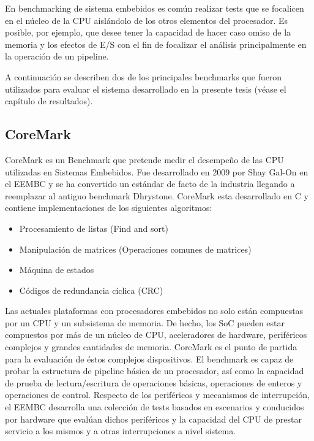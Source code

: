 En benchmarking de sistema embebidos es común realizar tests que se
focalicen en el núcleo de la CPU aislándolo de los otros elementos del
procesador. Es posible, por ejemplo, que desee tener la capacidad de
hacer caso omiso de la memoria y los efectos de E/S con el fin de
focalizar el análisis principalmente en la operación de un pipeline.

A continuación se describen dos de los principales benchmarks que
fueron utilizados para evaluar el sistema desarrollado en la presente
tesis (véase el capítulo de resultados).

\subsection{CoreMark}	

CoreMark es un Benchmark que pretende medir el desempeño de las CPU
utilizadas en Sistemas Embebidos. Fue desarrollado en 2009 por Shay
Gal-On en el EEMBC y se ha convertido un estándar de facto de la
industria llegando a reemplazar al antiguo benchmark
Dhrystone. CoreMark esta desarrollado en C y contiene implementaciones
de los siguientes algoritmos:
	
\begin{itemize}
\item Procesamiento de listas (Find and sort)
\item Manipulación de matrices (Operaciones comunes de matrices)
\item Máquina de estados 
\item Códigos de redundancia cíclica (CRC)  
\end{itemize}	 
	
Las actuales plataformas con procesadores embebidos no solo están
compuestas por un CPU y un subsistema de memoria. De hecho, los SoC
pueden estar compuestos por más de un núcleo de CPU, aceleradores de
hardware, periféricos complejos y grandes cantidades de
memoria. CoreMark es el punto de partida para la evaluación de éstos
complejos dispositivos. El benchmark es capaz de probar la estructura
de pipeline básica de un procesador, así como la capacidad de prueba
de lectura/escritura de operaciones básicas, operaciones de enteros y
operaciones de control. Respecto de los periféricos y mecanismos de
interrupción, el EEMBC desarrolla una colección de tests basados en
escenarios y conducidos por hardware que evalúan dichos periféricos
y la capacidad del CPU de prestar servicio a los mismos y a otras
interrupciones a nivel sistema.
	
